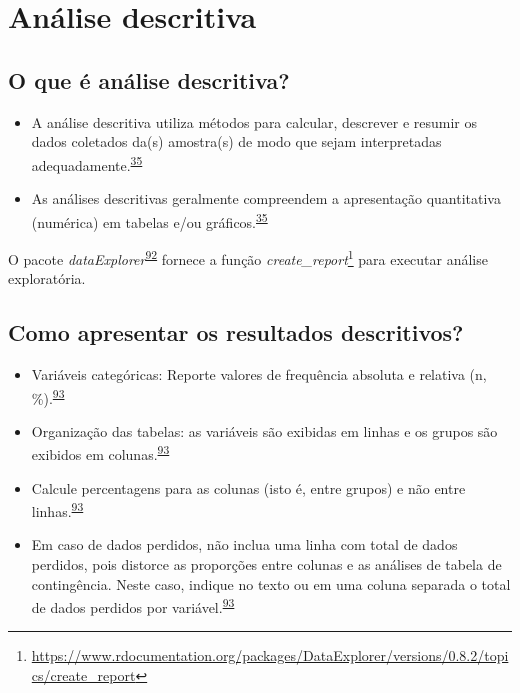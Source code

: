 \documentclass[
  a4paper,
]{book}
\renewcommand{\href}[2]{#2\footnote{\url{#1}}}
\newenvironment{infobox}[1]
  {
  \begin{itemize}
  \renewcommand{\labelitemi}{
    \raisebox{-.7\height}[0pt][0pt]{
      {\setkeys{Gin}{width=3em,keepaspectratio}
        \texttt{[image: \#1]}}
    }
  }
  \setlength{\fboxsep}{1em}
  \begin{blackbox}
  \item
  }
  {
  \end{blackbox}
  \end{itemize}
  }
\begin{document}
\hypertarget{descritiva}{%
\section{Análise descritiva}\label{descritiva}}

\hypertarget{o-que-uxe9-anuxe1lise-descritiva}{%
\subsection{O que é análise descritiva?}\label{o-que-uxe9-anuxe1lise-descritiva}}

\begin{itemize}
\item
  A análise descritiva utiliza métodos para calcular, descrever e resumir os dados coletados da(s) amostra(s) de modo que sejam interpretadas adequadamente.\textsuperscript{\protect\hyperlink{ref-vetter2017}{35}}
\item
  As análises descritivas geralmente compreendem a apresentação quantitativa (numérica) em tabelas e/ou gráficos.\textsuperscript{\protect\hyperlink{ref-vetter2017}{35}}
\end{itemize}

\begin{infobox}{images/Rlogo}
O pacote \emph{dataExplorer}\textsuperscript{\protect\hyperlink{ref-DataExplorer}{92}} fornece a função \href{https://www.rdocumentation.org/packages/DataExplorer/versions/0.8.2/topics/create_report}{\emph{create\_report}} para executar análise exploratória.

\end{infobox}

\hypertarget{como-apresentar-os-resultados-descritivos}{%
\subsection{Como apresentar os resultados descritivos?}\label{como-apresentar-os-resultados-descritivos}}

\begin{itemize}
\item
  Variáveis categóricas: Reporte valores de frequência absoluta e relativa (n, \%).\textsuperscript{\protect\hyperlink{ref-Cummings2003}{93}}
\item
  Organização das tabelas: as variáveis são exibidas em linhas e os grupos são exibidos em colunas.\textsuperscript{\protect\hyperlink{ref-Cummings2003}{93}}
\item
  Calcule percentagens para as colunas (isto é, entre grupos) e não entre linhas.\textsuperscript{\protect\hyperlink{ref-Cummings2003}{93}}
\item
  Em caso de dados perdidos, não inclua uma linha com total de dados perdidos, pois distorce as proporções entre colunas e as análises de tabela de contingência. Neste caso, indique no texto ou em uma coluna separada o total de dados perdidos por variável.\textsuperscript{\protect\hyperlink{ref-Cummings2003}{93}}
\end{itemize}
\end{document}
